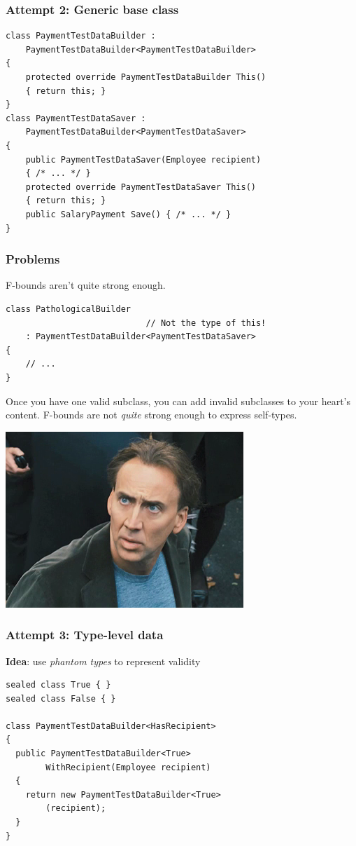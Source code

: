 \documentclass{beamer}
\begin{document}
  \begin{frame}[fragile]
    \frametitle{Attempt 2: Generic base class}
    \begin{verbatim}
class PaymentTestDataBuilder :
    PaymentTestDataBuilder<PaymentTestDataBuilder>
{
    protected override PaymentTestDataBuilder This()
    { return this; }
}
class PaymentTestDataSaver :
    PaymentTestDataBuilder<PaymentTestDataSaver>
{
    public PaymentTestDataSaver(Employee recipient)
    { /* ... */ }
    protected override PaymentTestDataSaver This()
    { return this; }
    public SalaryPayment Save() { /* ... */ }
}
    \end{verbatim}
\end{frame}

  \begin{frame}[fragile]
    \frametitle{Problems}
    F-bounds aren't quite strong enough.
    \begin{verbatim}
class PathologicalBuilder
                            // Not the type of this!
    : PaymentTestDataBuilder<PaymentTestDataSaver>
{
    // ...
}
    \end{verbatim}
    
    Once you have one valid subclass, you can add invalid subclasses to your heart's content.
    F-bounds are not \emph{quite} strong enough to express self-types.
\end{frame}

  \begin{frame}
    \centering
    \includegraphics[scale=0.8]{nic.png}
  \end{frame}

  \begin{frame}[fragile]
    \frametitle{Attempt 3: Type-level data}
    \textbf{Idea}: use \emph{phantom types} to represent validity
    \begin{verbatim}
sealed class True { }
sealed class False { }

class PaymentTestDataBuilder<HasRecipient>
{
  public PaymentTestDataBuilder<True>
        WithRecipient(Employee recipient)
  {
    return new PaymentTestDataBuilder<True>
        (recipient);
  }
}
    \end{verbatim}
\end{frame}
\end{document}
